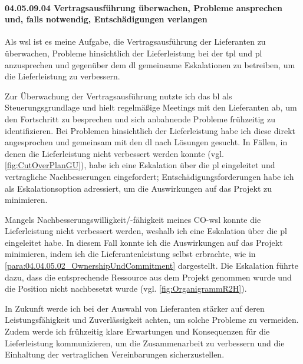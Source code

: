 \paragraph*{04.05.09.04 Vertragsausführung überwachen, Probleme ansprechen und, falls notwendig, Entschädigungen verlangen}
\label{para:04.05.09.04_Vertragsausführung}

\par Als \gls{wsl} ist es meine Aufgabe, die Vertragsausführung der Lieferanten zu überwachen, Probleme hinsichtlich der Lieferleistung bei der \gls{tpl} und \gls{pl} anzusprechen und gegenüber dem \gls{dl} gemeinsame Eskalationen zu betreiben, um die Lieferleistung zu verbessern.

\par Zur Überwachung der Vertragsausführung nutzte ich das \gls{bl} als Steuerungsgrundlage und hielt regelmäßige Meetings mit den Lieferanten ab, um den Fortschritt zu besprechen und sich anbahnende Probleme frühzeitig zu identifizieren. Bei Problemen hinsichtlich der Lieferleistung habe ich diese direkt angesprochen und gemeinsam mit den \gls{dl} nach Lösungen gesucht. In Fällen, in denen die Lieferleistung nicht verbessert werden konnte (vgl. \autoref{fig:CutOverPlanGU}), habe ich eine Eskalation über die \gls{pl} eingeleitet und vertragliche Nachbesserungen eingefordert; Entschädigungsforderungen habe ich als Eskalationsoption adressiert, um die Auswirkungen auf das Projekt zu minimieren.

\par Mangels Nachbesserungswilligkeit/-fähigkeit meines CO-\gls{wsl} konnte die Lieferleistung nicht verbessert werden, weshalb ich eine Eskalation über die \gls{pl} eingeleitet habe. In diesem Fall konnte ich die Auswirkungen auf das Projekt minimieren, indem ich die Lieferantenleistung selbst erbrachte, wie in \ref{para:04.04.05.02_OwnershipUndCommitment} dargestellt. Die Eskalation führte dazu, dass die entsprechende Ressource aus dem Projekt genommen wurde und die Position nicht nachbesetzt wurde (vgl. \autoref{fig:OrganigrammR2H}).

\par In Zukunft werde ich bei der Auswahl von Lieferanten stärker auf deren Leistungsfähigkeit und Zuverlässigkeit achten, um solche Probleme zu vermeiden. Zudem werde ich frühzeitig klare Erwartungen und Konsequenzen für die Lieferleistung kommunizieren, um die Zusammenarbeit zu verbessern und die Einhaltung der vertraglichen Vereinbarungen sicherzustellen.